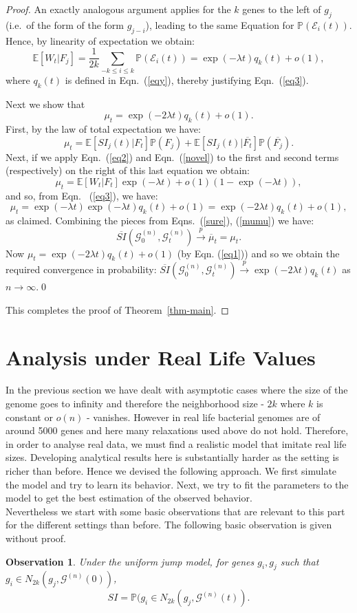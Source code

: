 \documentclass[runningheads, 11pt]{llncs}
\newtheorem{observation}[thm]{Observation}
\newcommand{\cE}{\mathcal{E}}
\newcommand{\EE}{\mathbb{E}}
\newcommand{\PP}{\mathbb{P}}
\newcommand{\G}{\mathcal{G}^{(n)}}
\begin{document}
\begin{proof}
An exactly analogous argument applies for the $k$ genes to the left of $g_j$
(i.e.~of the form of the form $g_{j-i}$), leading to the same Equation for
$\PP(\cE_i(t))$. Hence, by linearity of expectation we obtain:
$$\EE[W_t|F_j] = \frac{1}{2k} \sum_{-k \leq i \leq k} \PP(\cE_i(t)) = \exp(-\lambda t)q_{k}(t) + o(1),$$
where $q_k(t)$ is defined in Eqn.~(\ref{eqy}), thereby justifying
Eqn.~(\ref{eq3}).


Next we show that 
\begin{equation}
\label{eq1}
\mu_t =\exp(-2\lambda t)q_k(t) +o(1).
\end{equation}
First, by the law of total expectation we have: $$\mu_t = \EE[
SI_j(t)|F_t]\PP(F_j) + \EE[ SI_j(t)|\overline{F_t}]\PP(\overline{F_j}).$$ Next,
if we apply Eqn.~(\ref{eq2}) and Eqn.~(\ref{novel}) to the first and second
terms (respectively) on the right of this last equation we obtain: $$\mu_t =
\EE[W_t|F_t] \exp(-\lambda t) + o(1) (1-\exp(-\lambda t)),$$ and so, from Eqn.~
(\ref{eq3}), we have: $$ \mu_t = \exp(-\lambda t) \exp(-\lambda t)q_k(t) +o(1) =
\exp(-2\lambda t)q_k(t) +o(1),$$ as claimed.
Combining the pieces from Eqns.~(\ref{sure}), (\ref{mumu}) we have:
$$\overline{SI}(\G_0, \G_t) \xrightarrow{p} \overline{\mu}_t = \mu_t.$$ Now
$\mu_t =\exp(-2\lambda t)q_k(t) +o(1)$ (by Eqn. (\ref{eq1})) and so we obtain
the required convergence in probability: $\overline{SI}(\G_0, \G_t)
\xrightarrow{p} \exp(-2\lambda t)q_k(t)$ as $n \rightarrow \infty$.\qed

This completes the proof of Theorem~\ref{thm-main}.
\end{proof}

\section{Analysis under Real Life Values}
In the previous section we have dealt with asymptotic cases where the size of
the genome goes to infinity and therefore the neighborhood size - $2k$ where $k$
is constant or $o(n)$ - vanishes. However in real life bacterial genomes are of
around 5000 genes and here many relaxations used above do not hold. Therefore,
in order to analyse real data, we must find a realistic model that imitate real
life sizes. Developing analytical results here is substantially harder as the
setting is richer than before. Hence we devised the following approach. We first
simulate the model and try to learn its behavior. Next, we try to fit the
parameters to the model to get the best estimation of the observed behavior. \\
Nevertheless we start with some basic observations that are relevant to this
part for the different settings than before. The following basic observation is
given without proof.
\begin{observation}
\label{obs-SI-as-prob}
Under the uniform jump model, for genes $g_i, g_j$ such that $g_i \in N_{2k}
(g_j,\G(0))$,
$$SI=\PP(g_i \in N_{2k}(g_j,\G(t)).$$
\end{observation}
\end{document}
